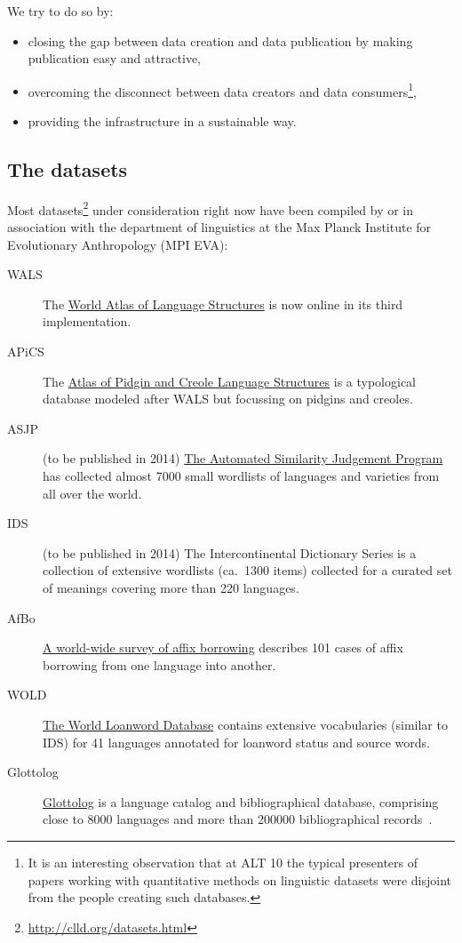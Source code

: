 \documentclass[a4paper,10pt]{article}
\begin{document}
We try to do so by:
\begin{itemize}
\item closing the gap between data creation and data publication by making publication easy and attractive,
\item overcoming the disconnect between data creators and data consumers\footnote{It is an interesting observation that at ALT 10 the typical presenters of papers working with quantitative methods on linguistic datasets were disjoint from the people creating such databases.},
\item providing the infrastructure in a sustainable way.
\end{itemize}

\subsection{The datasets}
Most datasets\footnote{\url{http://clld.org/datasets.html}} under consideration right now have been compiled by or in association with the department of linguistics at the Max Planck Institute for Evolutionary Anthropology (MPI EVA):
\begin{description}
\item[WALS] The \href{http://wals.info}{World Atlas of Language Structures} is now online in its third implementation.
\item[APiCS] The \href{http://apics-online.info}{Atlas of Pidgin and Creole Language Structures} is a typological database modeled after WALS but focussing on pidgins and creoles.
\item[ASJP] (to be published in 2014) \href{http://wwwstaff.eva.mpg.de/~wichmann/ASJPHomePage.htm}{The Automated Similarity Judgement Program} has collected almost 7000 small wordlists of languages and varieties from all over the world.
\item[IDS] (to be published in 2014) The Intercontinental Dictionary Series is a collection of extensive wordlists (ca.~1300 items)
collected for a curated set of meanings covering more than 220 languages.
\item[AfBo] \href{http://afbo.info/}{A world-wide survey of affix borrowing} describes 101 cases of affix borrowing from one language into another.
\item[WOLD] \href{http://wold.livingsources.org}{The World Loanword Database} contains extensive vocabularies (similar to IDS) for 41 languages annotated for loanword status and source words.
\item[Glottolog] \href{http://glottolog.org}{Glottolog} is a language catalog and bibliographical database, comprising close to 8000 languages and more than 200000 bibliographical records~\cite{nordhoff2012}.
\end{description}
\end{document}
